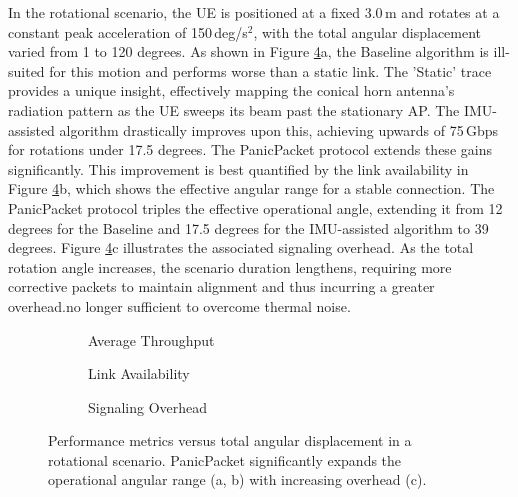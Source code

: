 \documentclass[fleqn,10pt]{wlscirep}
\begin{document}
In the rotational scenario, the UE is positioned at a fixed 3.0\,m and rotates at a constant peak acceleration of 150\,deg/s$^2$, with the total angular displacement varied from 1 to 120 degrees. As shown in Figure \ref{fig:angle_effects}a, the Baseline algorithm is ill-suited for this motion and performs worse than a static link. The 'Static' trace provides a unique insight, effectively mapping the conical horn antenna's radiation pattern as the UE sweeps its beam past the stationary AP. The IMU-assisted algorithm drastically improves upon this, achieving upwards of 75\,Gbps for rotations under 17.5 degrees. The PanicPacket protocol extends these gains significantly. This improvement is best quantified by the link availability in Figure \ref{fig:angle_effects}b, which shows the effective angular range for a stable connection. The PanicPacket protocol triples the effective operational angle, extending it from 12 degrees for the Baseline and 17.5 degrees for the IMU-assisted algorithm to 39 degrees. Figure \ref{fig:angle_effects}c illustrates the associated signaling overhead. As the total rotation angle increases, the scenario duration lengthens, requiring more corrective packets to maintain alignment and thus incurring a greater overhead.no longer sufficient to overcome thermal noise.

\begin{figure}[ht!]
    \centering
    \begin{subfigure}[t]{0.49\textwidth}
        \vspace{0pt} %
        \centering
        
        \vspace{-25 pt}
        \caption{Average Throughput}
        \label{fig:angle_rate}
    \end{subfigure}%
    \hfill
    \begin{minipage}[t]{0.49\textwidth}
        \vspace{0pt} %
        \centering
        \begin{subfigure}{\linewidth}
            
            \vspace{-25 pt}
            \caption{Link Availability}
        \label{fig:angle_avail}
        \end{subfigure}
        \vfill
        \begin{subfigure}{\linewidth}
            
            \vspace{-25 pt}
            \caption{Signaling Overhead}
        \label{fig:angle_overhead}
        \end{subfigure}
    \end{minipage}
    \caption{Performance metrics versus total angular displacement in a rotational scenario. PanicPacket significantly expands the operational angular range (a, b) with increasing overhead (c).}
    \label{fig:angle_effects}
\end{figure}
\end{document}
